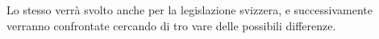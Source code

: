 Lo stesso verrà svolto anche per la legislazione svizzera, e successivamente verranno confrontate cercando di tro vare delle possibili differenze.